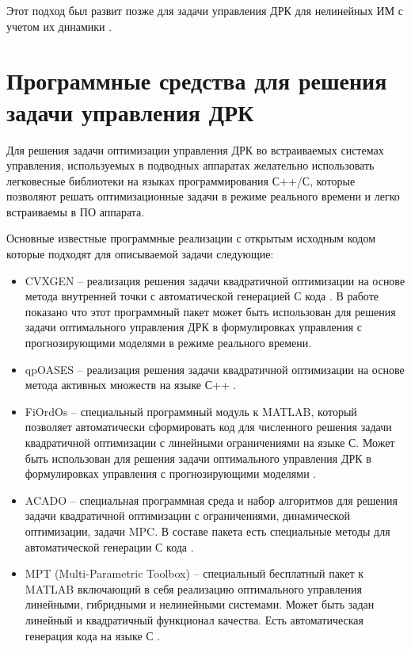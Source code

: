 Этот подход был развит позже для задачи управления ДРК для нелинейных ИМ с учетом их динамики \cite{10.4173/mic.2008.2.4}.
\section{Программные средства для решения задачи управления ДРК}
Для решения задачи оптимизации управления ДРК во встраиваемых системах управления, используемых в подводных аппаратах желательно использовать легковесные библиотеки на языках программирования С++/С, которые позволяют решать оптимизационные задачи в режиме реального времени и легко встраиваемы в ПО аппарата.

Основные известные программные реализации с открытым исходным кодом которые подходят для описываемой задачи следующие:
\begin{itemize}
    \item CVXGEN -- реализация решения задачи квадратичной оптимизации на основе метода внутренней точки с автоматической генерацией С кода \cite{mattingley2010real}. В работе \cite{10.1109/icca.2011.6137940} показано что этот программный пакет может быть использован для решения задачи оптимального управления ДРК в формулировках управления с прогнозирующими моделями в режиме реального времени.
    \item qpOASES -- реализация решения задачи квадратичной оптимизации на основе метода активных множеств на языке С++ \cite{ferreau2014qpoases}.
    \item FiOrdOs -- специальный программный модуль к MATLAB, который позволяет автоматически сформировать код для численного решения задачи квадратичной оптимизации с линейными ограничениями на языке С. Может быть использован для решения задачи оптимального управления ДРК в формулировках управления с прогнозирующими моделями \cite{jones2012fast}.
    \item ACADO -- специальная программная среда и набор алгоритмов для решения задачи квадратичной оптимизации с ограничениями, динамической оптимизации, задачи MPC. В составе пакета есть специальные методы для автоматической генерации С кода \cite{houska2011acado}.
    \item MPT (Multi-Parametric Toolbox) -- специальный бесплатный пакет к MATLAB включающий в себя реализацию оптимального управления линейными, гибридными и нелинейными системами. Может быть задан линейный и квадратичный функционал качества. Есть автоматическая генерация кода на языке С \cite{kvasnica2004multi}.
\end{itemize}

